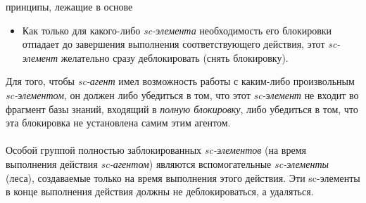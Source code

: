 \begin{SCn}
\begin{scnsubstruct}
\begin{scnrelfromlist}{принципы, лежащие в основе}
{\begin{itemize}
            \item Как только для какого-либо \textit{sc-элемента} необходимость его блокировки отпадает до завершения выполнения соответствующего действия, этот \textit{sc-элемент} желательно сразу деблокировать (снять блокировку).
        \end{itemize}
        Для того, чтобы \textit{sc-агент} имел возможность работы с каким-либо произвольным \textit{sc-элементом}, он должен либо убедиться в том, что этот \textit{sc-элемент} не входит во фрагмент базы знаний, входящий в \textit{полную блокировку}, либо убедиться в том, что эта блокировка не установлена самим этим агентом.\\
        \\Особой группой полностью заблокированных \textit{sc-элементов} (на время выполнения действия \textit{\mbox{sc-агентом}}) являются вспомогательные \textit{sc-элементы} (леса), создаваемые только на время выполнения этого действия. Эти sc-элементы в конце выполнения действия должны не деблокироваться, а удаляться.}
\end{scnrelfromlist}

\begin{scnsubstruct}
    

\end{scnsubstruct}
\end{scnsubstruct}
\end{SCn}
